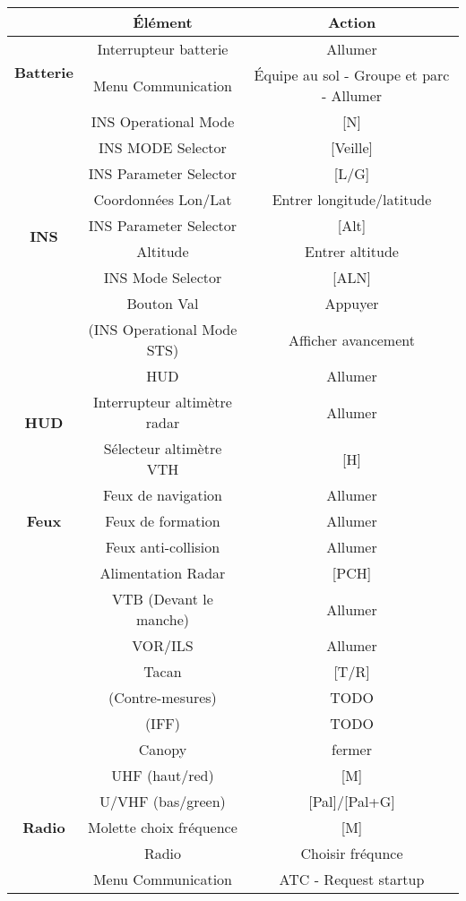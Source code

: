 \documentclass[12pt]{article}
\begin{document}
\begin{longtable}{|c|c|c|}
  \hline
  & \textbf{Élément} & \textbf{Action} \\
  \hline
  \multirow{2}{*}{\textbf{Batterie}}
  & Interrupteur batterie & Allumer \\
  & Menu Communication & Équipe au sol - Groupe et parc - Allumer \\
  \hline
  \multirow{9}{*}{\textbf{INS}}
  & INS Operational Mode & [N] \\
  & INS MODE Selector & [Veille] \\
  & INS Parameter Selector & [L/G] \\
  & Coordonnées Lon/Lat & Entrer longitude/latitude\\
  & INS Parameter Selector & [Alt] \\
  & Altitude & Entrer altitude\\
  & INS Mode Selector & [ALN] \\
  & Bouton Val & Appuyer \\
  & (INS Operational Mode STS) & Afficher avancement\\
  \hline
  \multirow{3}{*}{\textbf{HUD}}
  & HUD & Allumer \\
  & Interrupteur altimètre radar & Allumer \\
  & Sélecteur altimètre VTH & [H] \\
  \hline
  \multirow{3}{*}{\textbf{Feux}}
  & Feux de navigation & Allumer \\
  & Feux de formation & Allumer \\
  & Feux anti-collision & Allumer \\
  \hline
  & Alimentation Radar & [PCH] \\
  & VTB (Devant le manche) & Allumer\\
  & VOR/ILS & Allumer \\
  & Tacan & [T/R] \\
  & (Contre-mesures) & TODO \\
  & (IFF) & TODO \\
  & Canopy & fermer \\
  \hline
  \multirow{5}{*}{\textbf{Radio}}
  & UHF (haut/red) & [M] \\
  & U/VHF (bas/green) & [Pal]/[Pal+G] \\
  & Molette choix fréquence & [M] \\
  & Radio & Choisir fréqunce \\
  & Menu Communication & ATC - Request  startup \\
  \hline

\end{longtable}
\end{document}
